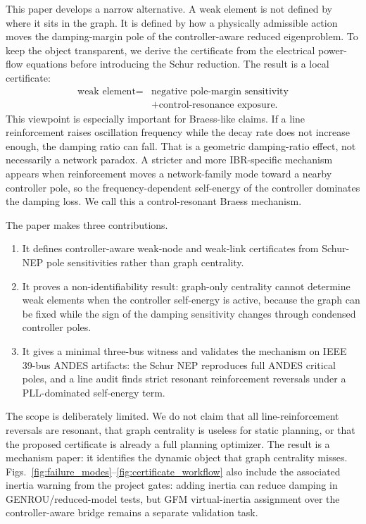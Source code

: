 \documentclass[conference]{IEEEtran}
\begin{document}
This paper develops a narrow alternative. A weak element is not defined by where it sits in the graph. It is defined by how a physically admissible action moves the damping-margin pole of the controller-aware reduced eigenproblem. To keep the object transparent, we derive the certificate from the electrical power-flow equations before introducing the Schur reduction. The result is a local certificate:
\[
  \begin{split}
  \text{weak element}={}&
  \text{negative pole-margin sensitivity}\\
  &+\text{control-resonance exposure}.
  \end{split}
\]
This viewpoint is especially important for Braess-like claims. If a line reinforcement raises oscillation frequency while the decay rate does not increase enough, the damping ratio can fall. That is a geometric damping-ratio effect, not necessarily a network paradox. A stricter and more IBR-specific mechanism appears when reinforcement moves a network-family mode toward a nearby controller pole, so the frequency-dependent self-energy of the controller dominates the damping loss. We call this a control-resonant Braess mechanism.

The paper makes three contributions.
\begin{enumerate}
\item It defines controller-aware weak-node and weak-link certificates from Schur-NEP pole sensitivities rather than graph centrality.
\item It proves a non-identifiability result: graph-only centrality cannot determine weak elements when the controller self-energy is active, because the graph can be fixed while the sign of the damping sensitivity changes through condensed controller poles.
\item It gives a minimal three-bus witness and validates the mechanism on IEEE 39-bus ANDES artifacts: the Schur NEP reproduces full ANDES critical poles, and a line audit finds strict resonant reinforcement reversals under a PLL-dominated self-energy term.
\end{enumerate}
The scope is deliberately limited. We do not claim that all line-reinforcement reversals are resonant, that graph centrality is useless for static planning, or that the proposed certificate is already a full planning optimizer. The result is a mechanism paper: it identifies the dynamic object that graph centrality misses. Figs.~\ref{fig:failure_modes}--\ref{fig:certificate_workflow} also include the associated inertia warning from the project gates: adding inertia can reduce damping in GENROU/reduced-model tests, but GFM virtual-inertia assignment over the controller-aware bridge remains a separate validation task.
\end{document}
